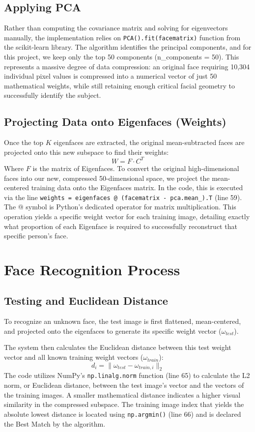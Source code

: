 \documentclass[12pt]{article}
\begin{document}
\subsection{Applying PCA}
Rather than computing the covariance matrix and solving for eigenvectors manually, the implementation relies on \texttt{PCA().fit(facematrix)} function from the scikit-learn library. The algorithm identifies the principal components, and for this project, we keep only the top 50 components (n\_components = 50). This represents a massive degree of data compression: an original face requiring 10,304 individual pixel values is compressed into a numerical vector of just 50 mathematical weights, while still retaining enough critical facial geometry to successfully identify the subject.

\subsection{Projecting Data onto Eigenfaces (Weights)}
Once the top $K$ eigenfaces are extracted, the original mean-subtracted faces are projected onto this new subspace to find their weights:
\begin{equation}
    W = F \cdot C^T
\end{equation}
Where $F$ is the matrix of Eigenfaces. 
To convert the original high-dimensional faces into our new, compressed 50-dimensional space, we project the mean-centered training data onto the Eigenfaces matrix. In the code, this is executed via the line \texttt{weights = eigenfaces @ (facematrix - pca.mean\_).T} (line 59). The @ symbol is Python's dedicated operator for matrix multiplication. This operation yields a specific weight vector for each training image, detailing exactly what proportion of each Eigenface is required to successfully reconstruct that specific person's face.

\section{Face Recognition Process}
\subsection{Testing and Euclidean Distance}
To recognize an unknown face, the test image is first flattened, mean-centered, and projected onto the eigenfaces to generate its specific weight vector ($\omega_{test}$). 

The system then calculates the Euclidean distance between this test weight vector and all known training weight vectors ($\omega_{train}$):
\begin{equation}
    d_i = \|\omega_{test} - \omega_{train, i}\|_2
\end{equation}
The code utilizes NumPy's \texttt{np.linalg.norm} function (line 65) to calculate the L2 norm, or Euclidean distance, between the test image's vector and the vectors of the training images. A smaller mathematical distance indicates a higher visual similarity in the compressed subspace. The training image index that yields the absolute lowest distance is located using \texttt{np.argmin()} (line 66) and is declared the Best Match by the algorithm.
\end{document}
